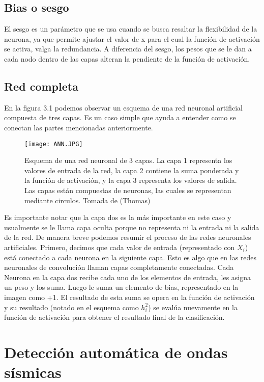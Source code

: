 \documentclass[../main.tex]{subfiles}
\begin{document}
\subsection{Bias o sesgo} 

El sesgo es un parámetro que se usa cuando se busca resaltar la flexibilidad de la neurona, ya que permite ajustar el valor de x para el cual la función de activación se activa, valga la redundancia. A diferencia del sesgo, los pesos que se le dan a cada nodo dentro de las capas alteran la pendiente de la función de activación. 

\subsection{Red completa}
En la figura 3.1 podemos observar un esquema de una red neuronal artificial compuesta de tres capas. Es un caso simple que ayuda a entender como se conectan las partes mencionadas anteriormente. 

\begin{figure}[h]
    \centering
    \texttt{[image: ANN.JPG]}
    \label{fig:ejemplo}
    \centering
    \caption{\centering Esquema de una red neuronal de 3 capas. La capa 1 representa los valores de entrada de la red, la capa 2 contiene la suma ponderada y la función de activación, y la capa 3 representa los valores de salida. Las capas están compuestas de neuronas, las cuales se representan mediante circulos. Tomada de (Thomas)}
\end{figure}

Es importante notar que la capa dos es la más importante en este caso y usualmente se le llama capa oculta porque no representa ni la entrada ni la salida de la red. De manera breve podemos resumir el proceso de las redes neuronales artificiales. Primero, decimos que cada valor de entrada (representado con $X_i$) está conectado a cada neurona en la siguiente capa. Esto es algo que en las redes neuronales de convolución llaman capas completamente conectadas. Cada Neurona en la capa dos recibe cada uno de los elementos de entrada, les asigna un peso y los suma. Luego le suma un elemento de bias, representado en la imagen como +1. El resultado de esta suma se opera en la función de activación y su resultado (notado en el esquema como $h_i^{2}$) se evalúa nuevamente en la función de activación para obtener el resultado final de la clasificación. 
 
\newpage
\section{Detección automática de ondas sísmicas}
\end{document}
